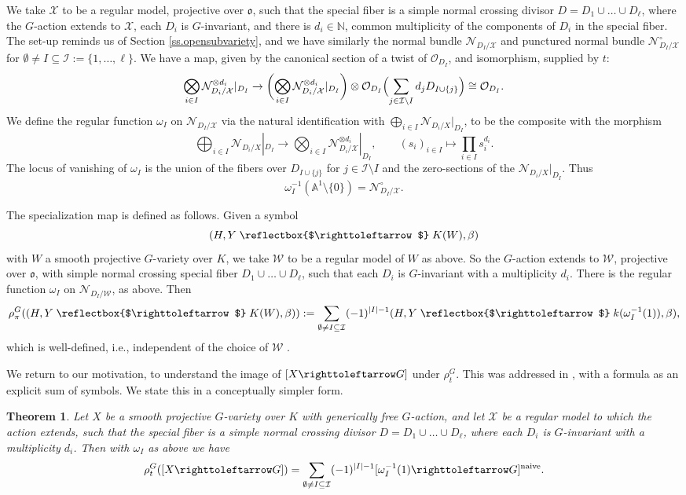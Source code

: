 \documentclass[12pt,reqno]{amsart}
\theoremstyle{plain}
\newtheorem{theo}[prop]{Theorem}
\theoremstyle{remark}
\theoremstyle{definition}
\numberwithin{equation}{section}
\newcommand{\A}{{\mathbb A}}
\newcommand{\cO}{{\mathcal O}}
\newcommand{\cI}{{\mathcal I}}
\newcommand{\cX}{{\mathcal X}}
\newcommand{\cW}{{\mathcal W}}
\newcommand{\actsfromleft}{\mathrel{\reflectbox{$\righttoleftarrow$}}}
\newcommand{\actsfromright}{\righttoleftarrow}
\begin{document}
We take $\cX$ to be a regular model, projective over $\mathfrak{o}$, such that the special fiber is a simple normal crossing divisor $D=D_1\cup\dots\cup D_\ell$, where the $G$-action extends to $\cX$, each $D_i$ is $G$-invariant, and there is $d_i\in \mathbb{N}$, common multiplicity of the components of $D_i$ in the special fiber.
The set-up reminds us of Section \ref{ss.opensubvariety}, and we have similarly the normal bundle $\mathcal{N}_{D_I/\cX}$ and punctured normal bundle $\mathcal{N}_{D_I/\cX}^\circ$ for $\emptyset\ne I\subseteq \cI:=\{1,\dots,\ell\}$.
We have a map, given by the canonical section of a twist of $\cO_{D_I}$, and isomorphism,
supplied by $t$:
\[
\bigotimes_{i\in I} \mathcal{N}_{D_i/\cX}^{\otimes d_i}|_{D_I}\to 
\biggl(\bigotimes_{i\in I} \mathcal{N}_{D_i/\cX}^{\otimes d_i}|_{D_I}\biggr)\otimes
\cO_{D_I}\Bigl(\sum_{j\in \cI\setminus I}d_jD_{I\cup\{j\}}\Bigr)\cong \cO_{D_I}.
\]
We define the regular function $\omega_I$ on $\mathcal{N}_{D_I/\cX}$ via the natural identification with $\bigoplus_{i\in I}\mathcal{N}_{D_i/X}|_{D_I}$,
to be the composite with the morphism
\[
\bigoplus_{i\in I}\mathcal{N}_{D_i/X}|_{D_I}\to
\bigotimes_{i\in I} \mathcal{N}_{D_i/\cX}^{\otimes d_i}|_{D_I},\qquad
(s_i)_{i\in I}\mapsto \prod_{i\in I}s_i^{d_i}.
\]
The locus of vanishing of $\omega_I$ is the union of the fibers over $D_{I\cup\{j\}}$ for $j\in \cI\setminus I$ and the zero-sections of the $\mathcal{N}_{D_i/X}|_{D_I}$.
Thus
\[
\omega_I^{-1}(\A^1\setminus\{0\})=\mathcal{N}_{D_I/\cX}^\circ.
\]

The specialization map is defined as follows.
Given a symbol
\[ (H,Y\actsfromleft K(W),\beta) \]
with $W$ a smooth projective $G$-variety over $K$, we take
$\mathcal{W}$ to be a regular model of $W$
as above.
So the $G$-action extends to
$\mathcal{W}$, projective over $\mathfrak{o}$,
with simple normal crossing special fiber
$D_1\cup\dots\cup D_\ell$, such that each $D_i$ is $G$-invariant with a multiplicity $d_i$.
There is the regular function $\omega_I$ on $\mathcal{N}_{D_I/\cW}$, as above.
Then
\[
\rho_\pi^G((H,Y\actsfromleft K(W),\beta)):=\sum_{\emptyset\ne I\subseteq \cI}(-1)^{|I|-1}(H,Y\actsfromleft k(\omega_I^{-1}(1)),\beta),
\]
which is well-defined, i.e.,
independent of the choice of $\cW$ \cite[Sect.\ 6]{BnG}.

We return to our motivation, to understand the image of $[X\actsfromright G]$ under $\rho_t^G$.
This was addressed in \cite[Thm.\ 6.6]{BnG}, with a formula as an explicit sum of symbols.
We state this in a conceptually simpler form.
\begin{theo}
\label{thm.revisitThm6.6}
Let $X$ be a smooth projective $G$-variety over $K$ with generically free $G$-action, and let $\cX$ be a regular model to which the action extends, such that the special fiber is a simple normal crossing divisor $D=D_1\cup \dots\cup D_\ell$, where each $D_i$ is $G$-invariant with a multiplicity $d_i$.
Then with $\omega_I$ as above we have
\[
\rho_t^G([X\actsfromright G])=
\sum_{\emptyset\ne I\subseteq \cI}
(-1)^{|I|-1}[\omega_I^{-1}(1)\actsfromright G]^{\mathrm{naive}}.
\]
\end{theo}
\end{document}
